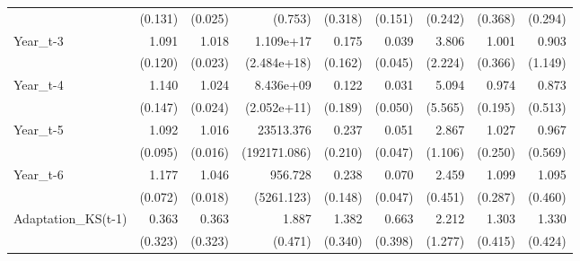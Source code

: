 \begin{table}[htbp]
\begin{tabular}{l*{8}{D{.}{.}{-1}}}
                    &     (0.131)         &     (0.025)         &     (0.753)         &     (0.318)         &     (0.151)         &     (0.242)         &     (0.368)         &     (0.294)         \\
Year\_t-3            &       1.091         &       1.018         &   1.109e+17\sym{*}  &       0.175\sym{*}  &       0.039\sym{***}&       3.806\sym{**} &       1.001         &       0.903         \\
                    &     (0.120)         &     (0.023)         & (2.484e+18)         &     (0.162)         &     (0.045)         &     (2.224)         &     (0.366)         &     (1.149)         \\
Year\_t-4            &       1.140         &       1.024         &   8.436e+09         &       0.122         &       0.031\sym{**} &       5.094\sym{\%}  &       0.974         &       0.873         \\
                    &     (0.147)         &     (0.024)         & (2.052e+11)         &     (0.189)         &     (0.050)         &     (5.565)         &     (0.195)         &     (0.513)         \\
Year\_t-5            &       1.092         &       1.016         &   23513.376         &       0.237\sym{\%}  &       0.051\sym{***}&       2.867\sym{***}&       1.027         &       0.967         \\
                    &     (0.095)         &     (0.016)         &(192171.086)         &     (0.210)         &     (0.047)         &     (1.106)         &     (0.250)         &     (0.569)         \\
Year\_t-6            &       1.177\sym{***}&       1.046\sym{***}&     956.728         &       0.238\sym{**} &       0.070\sym{***}&       2.459\sym{***}&       1.099         &       1.095         \\
                    &     (0.072)         &     (0.018)         &  (5261.123)         &     (0.148)         &     (0.047)         &     (0.451)         &     (0.287)         &     (0.460)         \\
Adaptation\_KS(t-1)  &       0.363         &       0.363         &       1.887\sym{**} &       1.382         &       0.663         &       2.212         &       1.303         &       1.330         \\
                    &     (0.323)         &     (0.323)         &     (0.471)         &     (0.340)         &     (0.398)         &     (1.277)         &     (0.415)         &     (0.424)         \\

\end{tabular}
\end{table}
